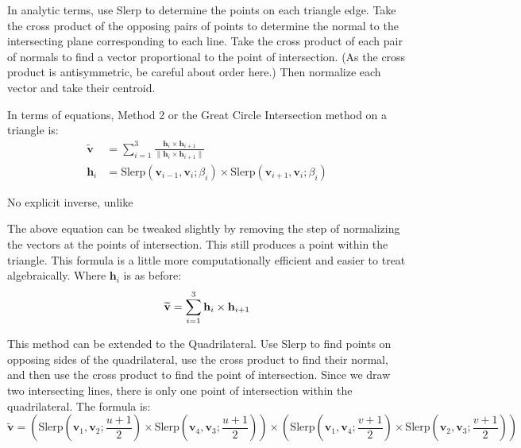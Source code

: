\documentclass{amsart}[12pt]
\begin{document}
In analytic terms, use Slerp to determine the points on each triangle edge.
Take the cross product of the opposing pairs of points to determine the normal
to the intersecting plane corresponding to each line. Take the cross product of
each pair of normals to find a vector proportional to the point of
intersection. (As the cross product is antisymmetric, be careful about order
here.) Then normalize each vector and take their centroid.

In terms of equations, Method 2 or the Great Circle Intersection
method on a triangle is:
\begin{equation}\begin{split}%
\widetilde{\mathbf v} & = \sum^3_{i=1} \frac{\mathbf h_i \times \mathbf h_{i+1}}
{\|\mathbf h_i \times \mathbf h_{i+1}\|} \\
\mathbf h_i & =
\mathrm{Slerp}(\mathbf v_{i-1}, \mathbf v_i; \beta_{i})
\times
\mathrm{Slerp}(\mathbf v_{i+1}, \mathbf v_i; \beta_{i})
\end{split}\end{equation}

No explicit inverse, unlike \cite{gray95}\cite{crider08}

The above equation can be tweaked slightly by removing the step of normalizing
the vectors at the points of intersection. This still produces a point within
the triangle. This formula is a little more computationally efficient and
easier to treat algebraically. Where $\mathbf h_i$ is as before:
\begin{equation}\label{eq:gct}%
\widetilde{\mathbf v} = \sum^3_{i=1} \mathbf h_i \times \mathbf h_{i+1} \\
\end{equation}

This method can be extended to the Quadrilateral. Use Slerp to find points on
opposing sides of the quadrilateral, use the cross product to find their
normal, and then use the cross product to find the point of intersection. Since
we draw two intersecting lines, there is only one point of intersection within
the quadrilateral. The formula is:
\begin{equation}\label{eq:gcq}%
\widetilde{\mathbf v} =
(\mathrm{Slerp}(\mathbf v_1, \mathbf v_2; \frac{u+1}{2})
\times
\mathrm{Slerp}(\mathbf v_4, \mathbf v_3; \frac{u+1}{2}))
\times
(\mathrm{Slerp}(\mathbf v_1, \mathbf v_4; \frac{v+1}{2})
\times
\mathrm{Slerp}(\mathbf v_2, \mathbf v_3; \frac{v+1}{2}))
\end{equation}
\end{document}

